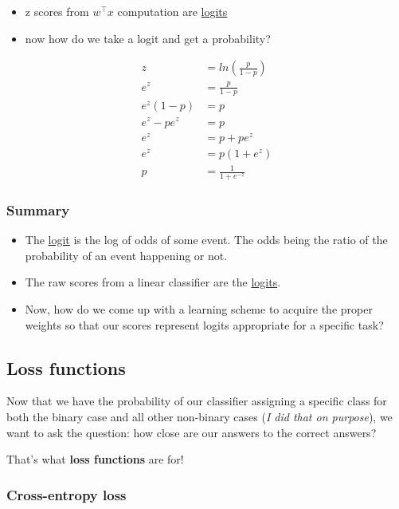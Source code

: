\documentclass[11pt]{article}
\begin{document}
\begin{itemize}
	\item z scores from $w^\top x$ computation are \ul{logits}
	\item now how do we take a logit and get a probability?
\end{itemize}

\begin{align*}
	z          & = ln(\frac{p}{1-p})  \\
	e^z        & = \frac{p}{1-p}      \\
	e^z(1-p)   & = p                  \\
	e^z - pe^z & = p                  \\
	e^z        & = p + pe^z           \\
	e^z        & = p(1+e^z)           \\
	p          & = \frac{1}{1+e^{-z}}
\end{align*}


\subsubsection*{Summary}

\begin{itemize}
	\item The \ul{logit} is the log of odds of some event. The odds being the
	      ratio of the probability of an event happening or not.
	\item The raw scores from a linear classifier are the \ul{logits}.
	\item Now, how do we come up with a learning scheme to acquire the proper
	      weights so that our scores represent logits appropriate for a specific
	      task?
\end{itemize}

\subsection{Loss functions}

Now that we have the probability of our classifier assigning a specific class
for both the binary case and all other non-binary cases (\textit{I did that on
	purpose}), we want to ask the question: how close are our answers to the
correct answers?

That's what \textbf{loss functions} are for!

\subsubsection{Cross-entropy loss}
\end{document}
